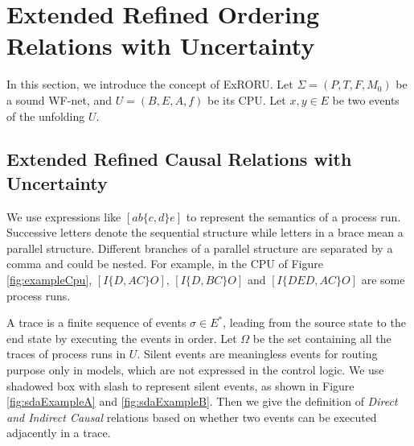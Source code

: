 \documentclass{llncs}
\begin{document}

\section{Extended Refined Ordering Relations with Uncertainty}\label{sec:relations}
In this section, we introduce the concept of ExRORU. Let $\Sigma=(P,T,F,M_{0})$ be a sound WF-net, and $U=(B,E,A,f)$ be its CPU. Let $x,y\in E$ be two events of the unfolding $U$.

\subsection{Extended Refined Causal Relations with Uncertainty}\label{subsec:causalAndInverseCausal}

We use expressions like $[ab\{c,d\}e]$ to represent the semantics of a process run. Successive letters denote the sequential structure while letters in a brace mean a parallel structure. Different branches of a parallel structure are separated by a comma and could be nested. For example, in the CPU of Figure \ref{fig:exampleCpu}, $[I\{D,AC\}O]$, $[I\{D,BC\}O]$ and $[I\{DED,AC\}O]$ are some process runs.

A trace is a finite sequence of events $\sigma\in E^{*}$, leading from the source state to the end state by executing the events in order. Let $\Omega$ be the set containing all the traces of process runs in $U$. Silent events are meaningless events for routing purpose only in models, which are not expressed in the control logic. We use shadowed box with slash to represent silent events, as shown in Figure \ref{fig:sdaExampleA} and \ref{fig:sdaExampleB}. Then we give the definition of \textit{Direct and Indirect Causal} relations based on whether two events can be executed adjacently in a trace.
\end{document}
